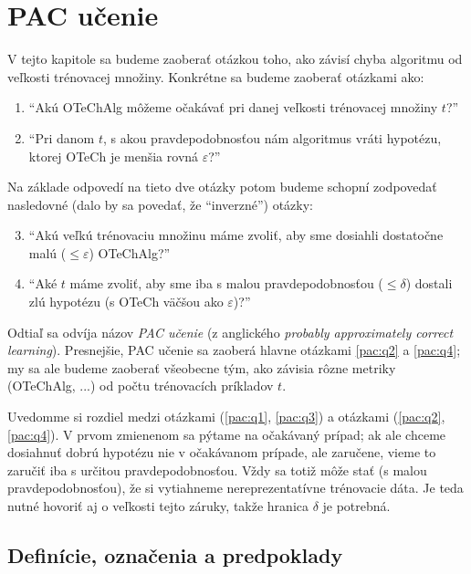 \section{PAC učenie}

V tejto kapitole sa budeme zaoberať otázkou toho, ako závisí chyba
algoritmu od veľkosti trénovacej množiny. Konkrétne sa budeme
zaoberať otázkami ako:
\begin{enumerate}
  \item ``Akú OTeChAlg môžeme očakávať pri danej veľkosti trénovacej množiny $t$?'' \label{pac:q1}
  \item ``Pri danom $t$, s akou pravdepodobnosťou nám algoritmus vráti
    hypotézu, ktorej OTeCh je menšia rovná $\varepsilon$?'' \label{pac:q2}
\end{enumerate}
Na základe odpovedí na tieto dve otázky potom budeme schopní zodpovedať
nasledovné (dalo by sa povedať, že ``inverzné'') otázky:
\begin{enumerate}
  \setcounter{enumi}{2}
  \item ``Akú veľkú trénovaciu množinu máme zvoliť, aby sme dosiahli
    dostatočne malú ($\leq \varepsilon$) OTeChAlg?'' \label{pac:q3}
  \item ``Aké $t$ máme zvoliť, aby sme iba s malou pravdepodobnosťou
    ($\leq \delta$) dostali zlú hypotézu (s OTeCh väčšou ako $\varepsilon$)?'' \label{pac:q4}
\end{enumerate}

Odtiaľ sa odvíja názov \emph{PAC učenie} (z anglického
\emph{probably approximately correct learning}). Presnejšie, PAC učenie
sa zaoberá hlavne otázkami \ref{pac:q2} a \ref{pac:q4}; my sa ale budeme
zaoberať všeobecne tým, ako závisia rôzne metriky (OTeChAlg, ...) od
počtu trénovacích príkladov $t$.

Uvedomme si rozdiel medzi otázkami (\ref{pac:q1}, \ref{pac:q3}) a otázkami
(\ref{pac:q2}, \ref{pac:q4}). V prvom zmienenom sa pýtame na očakávaný
prípad; ak ale chceme dosiahnuť dobrú hypotézu nie v očakávanom prípade,
ale zaručene, vieme to zaručiť iba s určitou pravdepodobnosťou. Vždy sa
totiž môže stať (s malou pravdepodobnosťou), že si vytiahneme
nereprezentatívne trénovacie dáta. Je teda nutné hovoriť aj o
veľkosti tejto záruky, takže hranica $\delta$ je potrebná.




\subsection{Definície, označenia a predpoklady}

